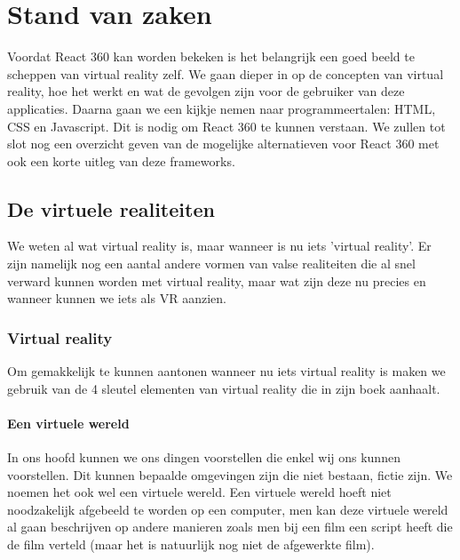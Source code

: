 \chapter{Stand van zaken}
\label{ch:stand-van-zaken}



Voordat React 360 kan worden bekeken is het belangrijk een goed beeld te scheppen van virtual reality zelf. We gaan dieper in op de concepten van virtual reality, hoe het werkt en wat de gevolgen zijn voor de gebruiker van deze applicaties. Daarna gaan we een kijkje nemen naar programmeertalen: HTML, CSS en Javascript. Dit is nodig om React 360 te kunnen verstaan. We zullen tot slot nog een overzicht geven van de mogelijke alternatieven voor React 360 met ook een korte uitleg van deze frameworks.

\section{De virtuele realiteiten}
\label{secvirtuele-realiteiten}
We weten al wat virtual reality is, maar wanneer is nu iets 'virtual reality'. Er zijn namelijk nog een aantal andere vormen van valse realiteiten die al snel verward kunnen worden met virtual reality, maar wat zijn deze nu precies en wanneer kunnen we iets als VR aanzien.

\subsection{Virtual reality}
\label{subsec:virtual-reality}
Om gemakkelijk te kunnen aantonen wanneer nu iets virtual reality is maken we gebruik van de 4 sleutel elementen van virtual reality die \autocite{Sherman2000} in zijn boek aanhaalt.

\subsubsection{Een virtuele wereld}
\label{ssubsec:virtuele-wereld}
In ons hoofd kunnen we ons dingen voorstellen die enkel wij ons kunnen voorstellen. Dit kunnen bepaalde omgevingen zijn die niet bestaan, fictie zijn. We noemen het ook wel een virtuele wereld. Een virtuele wereld hoeft niet noodzakelijk afgebeeld te worden op een computer, men kan deze virtuele wereld al gaan beschrijven op andere manieren zoals men bij een film een script heeft die de film verteld (maar het is natuurlijk nog niet de afgewerkte film).

